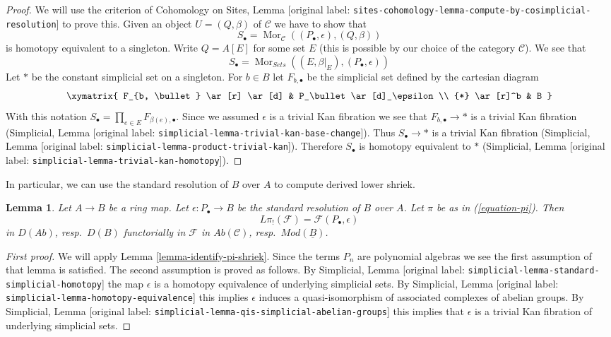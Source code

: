 \documentclass[10pt,a4paper]{article}
\theoremstyle{plain}
\newtheorem{lemma}[subsection]{Lemma}
\theoremstyle{definition}
\theoremstyle{remark}
\numberwithin{equation}{subsection}
\def\Mor{\mathop{\mathrm{Mor}}\nolimits}
\begin{document}
\begin{proof}
We will use the criterion of Cohomology on Sites, Lemma
\textnormal{[original label: \nolinkurl{sites-cohomology-lemma-compute-by-cosimplicial-resolution}]} to prove this.
Given an object $U = (Q, \beta)$ of $\mathcal{C}$ we have to show that
$$
S_\bullet = \Mor_\mathcal{C}((P_\bullet, \epsilon), (Q, \beta))
$$
is homotopy equivalent to a singleton.
Write $Q = A[E]$ for some set $E$ (this is possible by our choice of
the category $\mathcal{C}$). We see that
$$
S_\bullet = \Mor_{\textit{Sets}}((E, \beta|_E), (P_\bullet, \epsilon))
$$
Let $*$ be the constant simplicial set on a singleton. For $b \in B$
let $F_{b, \bullet}$ be the simplicial set defined by the cartesian
diagram
$$
\xymatrix{
F_{b, \bullet} \ar[r] \ar[d] & P_\bullet \ar[d]_\epsilon \\
{*} \ar[r]^b & B
}
$$
With this notation $S_\bullet = \prod_{e \in E} F_{\beta(e), \bullet}$.
Since we assumed $\epsilon$ is a trivial Kan fibration we see that
$F_{b, \bullet} \to *$ is a trivial Kan fibration
(Simplicial, Lemma \textnormal{[original label: \nolinkurl{simplicial-lemma-trivial-kan-base-change}]}).
Thus $S_\bullet \to *$ is a trivial Kan fibration
(Simplicial, Lemma \textnormal{[original label: \nolinkurl{simplicial-lemma-product-trivial-kan}]}).
Therefore $S_\bullet$ is homotopy equivalent to $*$
(Simplicial, Lemma \textnormal{[original label: \nolinkurl{simplicial-lemma-trivial-kan-homotopy}]}).
\end{proof}

\noindent
In particular, we can use the standard resolution of $B$ over $A$
to compute derived lower shriek.

\begin{lemma}
\label{lemma-pi-shriek-standard}
Let $A \to B$ be a ring map. Let $\epsilon : P_\bullet \to B$
be the standard resolution of $B$ over $A$. Let $\pi$ be as in
(\ref{equation-pi}). Then
$$
L\pi_!(\mathcal{F}) = \mathcal{F}(P_\bullet, \epsilon)
$$
in $D(\textit{Ab})$, resp.\ $D(B)$ functorially in $\mathcal{F}$ in
$\textit{Ab}(\mathcal{C})$, resp.\ $\textit{Mod}(\underline{B})$.
\end{lemma}

\begin{proof}[First proof]
We will apply Lemma \ref{lemma-identify-pi-shriek}.
Since the terms $P_n$ are polynomial algebras we see the first
assumption of that lemma is satisfied. The second assumption is proved
as follows. By
Simplicial, Lemma \textnormal{[original label: \nolinkurl{simplicial-lemma-standard-simplicial-homotopy}]}
the map $\epsilon$ is a homotopy equivalence of underlying
simplicial sets. By
Simplicial, Lemma \textnormal{[original label: \nolinkurl{simplicial-lemma-homotopy-equivalence}]}
this implies $\epsilon$ induces a quasi-isomorphism of associated
complexes of abelian groups. By
Simplicial, Lemma \textnormal{[original label: \nolinkurl{simplicial-lemma-qis-simplicial-abelian-groups}]}
this implies that $\epsilon$ is a trivial Kan fibration of underlying
simplicial sets.
\end{proof}
\end{document}
